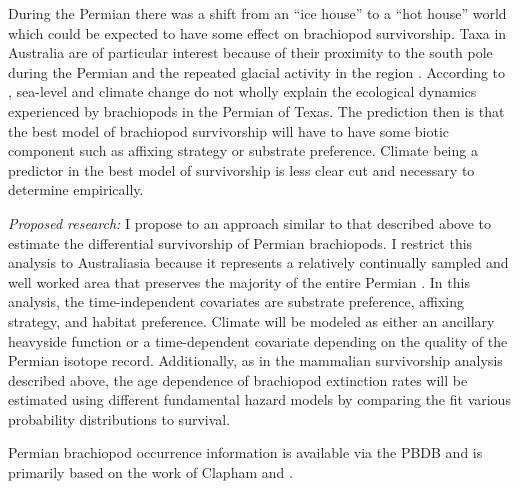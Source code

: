 \documentclass[12pt,letterpaper]{article}
\begin{document}
During the Permian there was a shift from an ``ice house'' to a ``hot house'' world \citep{Fielding2006,Birgenheier2010,Jones2006,Powell2007} which could be expected to have some effect on brachiopod survivorship. Taxa in Australia are of particular interest because of their proximity to the south pole during the Permian and the repeated glacial activity in the region \citep{Fielding2006,Birgenheier2010,Jones2006}. According to \citet{Olszewski2004}, sea-level and climate change do not wholly explain the ecological dynamics experienced by brachiopods in the Permian of Texas. The prediction then is that the best model of brachiopod survivorship will have to have some biotic component such as affixing strategy or substrate preference. Climate being a predictor in the best model of survivorship is less clear cut and necessary to determine empirically.


\textit{Proposed research:}
I propose to an approach similar to that described above to estimate the differential survivorship of Permian brachiopods. I restrict this analysis to Australiasia because it represents a relatively continually sampled and well worked area that preserves the majority of the entire Permian \citep{Clapham2012,Clapham2008a,Waterhouse1987,Archbold1995}. In this analysis, the time-independent covariates are substrate preference, affixing strategy, and habitat preference. Climate will be modeled as either an ancillary heavyside function or a time-dependent covariate depending on the quality of the Permian isotope record. Additionally, as in the mammalian survivorship analysis described above, the age dependence of brachiopod extinction rates will be estimated using different fundamental hazard models by comparing the fit various probability distributions to survival.

Permian brachiopod occurrence information is available via the PBDB and is primarily based on the work of Clapham \citep{Clapham2006,Clapham2008a,Clapham2007a,Clapham2012,Clapham2007} and \citet{Waterhouse1987}.
\end{document}
